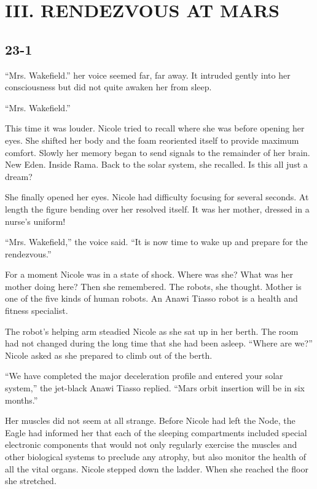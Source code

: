 \documentclass[]{article}
\begin{document}
{\newpage

\section{III. RENDEZVOUS AT MARS}

\subsection{23-1}

“Mrs. Wakefield.” her voice seemed far, far away. It intruded gently into her consciousness but did not quite awaken her from sleep.

“Mrs. Wakefield.”

This time it was louder. Nicole tried to recall where she was before opening her eyes. She shifted her body and the foam reoriented itself to provide maximum comfort. Slowly her memory began to send signals to the remainder of her brain. New Eden. Inside Rama. Back to the solar system, she recalled. Is this all just a dream?

She finally opened her eyes. Nicole had difficulty focusing for several seconds. At length the figure bending over her resolved itself. It was her mother, dressed in a nurse’s uniform!

“Mrs. Wakefield,” the voice said. “It is now time to wake up and prepare for the rendezvous.”

For a moment Nicole was in a state of shock. Where was she? What was her mother doing here? Then she remembered. The robots, she thought. Mother is one of the five kinds of human robots. An Anawi Tiasso robot is a health and fitness specialist.

The robot’s helping arm steadied Nicole as she sat up in her berth. The room had not changed during the long time that she had been asleep. “Where are we?” Nicole asked as she prepared to climb out of the berth.

“We have completed the major deceleration profile and entered your solar system,” the jet-black Anawi Tiasso replied. “Mars orbit insertion will be in six months.”

Her muscles did not seem at all strange. Before Nicole had left the Node, the Eagle had informed her that each of the sleeping compartments included special electronic components that would not only regularly exercise the muscles and other biological systems to preclude any atrophy, but also monitor the health of all the vital organs. Nicole stepped down the ladder. When she reached the floor she stretched.

}
\end{document}

